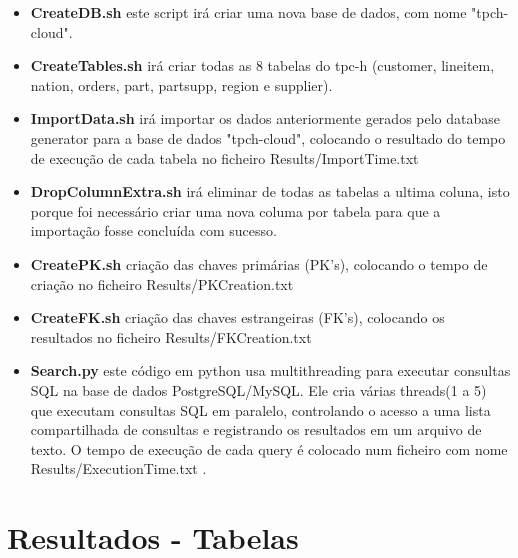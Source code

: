 \documentclass{article}
\begin{document}
\begin{itemize}
    \item \textbf{CreateDB.sh} este script irá criar uma nova base de dados, com nome "tpch-cloud".
    \item \textbf{CreateTables.sh} irá criar todas as 8 tabelas do tpc-h (customer, lineitem, nation, orders, part, partsupp, region e supplier).
    \item \textbf{ImportData.sh} irá importar os dados anteriormente gerados pelo database generator para a base de dados "tpch-cloud", colocando o resultado do tempo de execução de cada tabela no ficheiro Results/ImportTime.txt
    \item \textbf{DropColumnExtra.sh} irá eliminar de todas as tabelas a ultima coluna, isto porque foi necessário criar uma nova columa por tabela para que a importação fosse concluída com sucesso.
    \item \textbf{CreatePK.sh} criação das chaves primárias (PK's), colocando o tempo de criação no ficheiro Results/PKCreation.txt
    \item \textbf{CreateFK.sh} criação das chaves estrangeiras (FK's), colocando os resultados no ficheiro Results/FKCreation.txt
    \item \textbf{Search.py} este código em python usa multithreading para executar consultas SQL na base de dados PostgreSQL/MySQL. Ele cria várias threads(1 a 5) que executam consultas SQL em paralelo, controlando o acesso a uma lista compartilhada de consultas e registrando os resultados em um arquivo de texto. O tempo de execução de cada query é colocado num ficheiro com nome Results/ExecutionTime.txt .
     
\end{itemize}

\clearpage

\section{Resultados - Tabelas}
\end{document}

